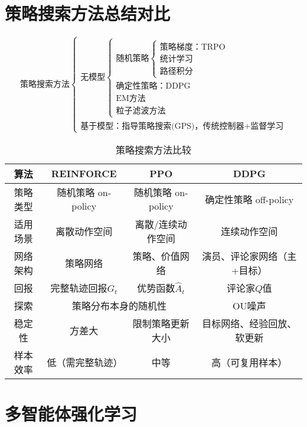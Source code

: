 \documentclass[
12pt, %
a4paper, 
oneside, %
headinclude,footinclude, %
]{scrartcl}
\begin{document}
\section{策略搜索方法总结对比}
$$
\text{策略搜索方法} \begin{cases} 
\text{无模型} \begin{cases} 
\text{随机策略} \begin{cases} 
\text{策略梯度：TRPO} \\ \text{统计学习} \\ \text{路径积分} \end{cases} \\ 
\text{确定性策略：DDPG} \\ \text{EM方法} \\ \text{粒子滤波方法} \end{cases} \\ 
\text{基于模型：指导策略搜索(GPS)，传统控制器+监督学习} \end{cases}
$$

\begin{table}[H]
\centering
\small
\begin{tabular}{|c|c|c|c|}
\hline
算法 & REINFORCE & PPO & DDPG \\
\hline
策略类型 & 随机策略 on-policy & 随机策略 on-policy & 确定性策略 off-policy \\
\hline
适用场景 & 离散动作空间 & 离散/连续动作空间 & 连续动作空间 \\
\hline
网络架构 & 策略网络 & 策略、价值网络 & 演员、评论家网络（主+目标） \\
\hline
回报 & 完整轨迹回报$ G_t $ & 优势函数$ \hat{A}_t $ & 评论家$ Q $值 \\
\hline
探索 & \multicolumn{2}{c|}{策略分布本身的随机性} & OU噪声 \\
\hline
稳定性 & 方差大 & 限制策略更新大小 & 目标网络、经验回放、软更新 \\
\hline
样本效率 & 低（需完整轨迹） & 中等 & 高（可复用样本） \\
\hline
\end{tabular}
\caption{策略搜索方法比较}
\end{table}
\section{多智能体强化学习}
\end{document}

